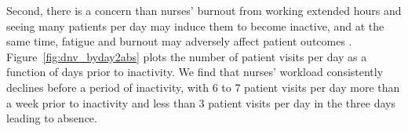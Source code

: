\documentclass[final,12pt, notitlepage]{article}
\begin{document}
Second, there is a concern than nurses' burnout from working extended hours and seeing many patients per day may induce them to become inactive, and at the same time, fatigue and burnout may adversely affect patient outcomes \citep{Aiken2002}. Figure~\ref{fig:dnv_byday2abs} plots the number of patient visits per day as a function of days prior to inactivity. We find that nurses' workload consistently declines before a period of inactivity, with 6 to 7 patient visits per day more than a week prior to inactivity and less than 3 patient visits per day in the three days leading to absence.
%
\end{document}
